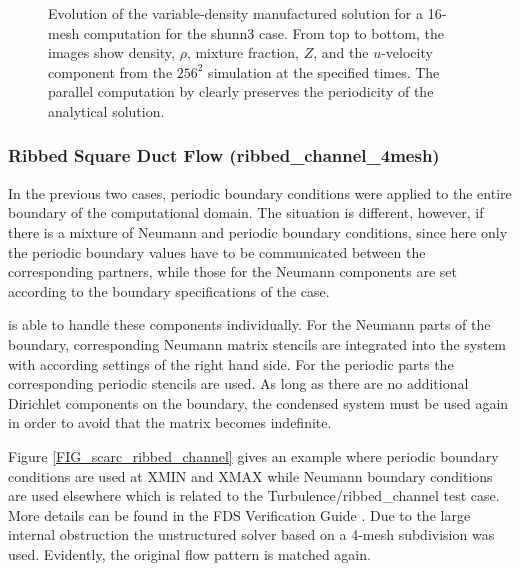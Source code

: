 \begin{figure}[ht]
\caption[Evolution of the variable-density manufactured solution for a 16-mesh \scarc{} computation]{Evolution of the variable-density manufactured solution for a 16-mesh \scarc{} computation for the {\ct shunn3} case.  From top to bottom, the images show density, $\rho$, mixture fraction, $Z$, and the $u$-velocity component from the $256^2$ simulation at the specified times. The parallel computation by \scarc{} clearly preserves the periodicity of the analytical solution.}
\label{FIG_scarc_shunn3}
\end{figure}




\subsubsection{Ribbed Square Duct Flow ({\ct ribbed\_channel\_4mesh})}

In the previous two cases, periodic boundary conditions were applied to the entire boundary of the computational domain. The situation is different, however, if there is a mixture of Neumann and periodic boundary conditions, since here only the periodic boundary values have to be communicated between the corresponding partners, while those for the Neumann components are set according to the boundary specifications of the case.

\scarc{} is able to handle these components individually. For the Neumann parts of the boundary, corresponding Neumann matrix stencils are integrated into the system with according settings of the right hand side. For the periodic parts the corresponding periodic stencils are used.
As long as there are no additional Dirichlet components on the boundary, the condensed system must be used again
in order to avoid that the matrix becomes indefinite. 

Figure \ref{FIG_scarc_ribbed_channel} gives an example where periodic boundary conditions are used at
{\ct XMIN} and {\ct XMAX} while Neumann boundary conditions are used elsewhere which is related to the
Turbulence/ribbed\_channel test case.
More details can be found in the FDS Verification Guide \cite{McGrattan:2018:VG}.
Due to the large internal obstruction the unstructured \uscarc{} solver based on a 4-mesh subdivision was used. Evidently, the original flow pattern is matched again. 

